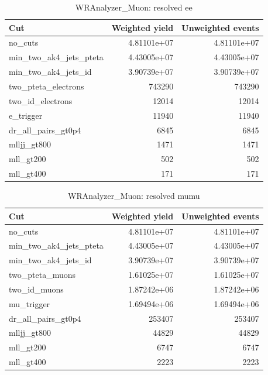 \documentclass{article}
\begin{document}
\begin{table}[htbp]
\centering
\caption{WRAnalyzer\_Muon: resolved ee}
\begin{tabular}{lrr}
\hline
Cut & Weighted yield & Unweighted events \\
\hline
no\_cuts & 4.81101e+07 & 4.81101e+07 \\
min\_two\_ak4\_jets\_pteta & 4.43005e+07 & 4.43005e+07 \\
min\_two\_ak4\_jets\_id & 3.90739e+07 & 3.90739e+07 \\
two\_pteta\_electrons & 743290 & 743290 \\
two\_id\_electrons & 12014 & 12014 \\
e\_trigger & 11940 & 11940 \\
dr\_all\_pairs\_gt0p4 & 6845 & 6845 \\
mlljj\_gt800 & 1471 & 1471 \\
mll\_gt200 & 502 & 502 \\
mll\_gt400 & 171 & 171 \\
\hline
\end{tabular}
\end{table}

\begin{table}[htbp]
\centering
\caption{WRAnalyzer\_Muon: resolved mumu}
\begin{tabular}{lrr}
\hline
Cut & Weighted yield & Unweighted events \\
\hline
no\_cuts & 4.81101e+07 & 4.81101e+07 \\
min\_two\_ak4\_jets\_pteta & 4.43005e+07 & 4.43005e+07 \\
min\_two\_ak4\_jets\_id & 3.90739e+07 & 3.90739e+07 \\
two\_pteta\_muons & 1.61025e+07 & 1.61025e+07 \\
two\_id\_muons & 1.87242e+06 & 1.87242e+06 \\
mu\_trigger & 1.69494e+06 & 1.69494e+06 \\
dr\_all\_pairs\_gt0p4 & 253407 & 253407 \\
mlljj\_gt800 & 44829 & 44829 \\
mll\_gt200 & 6747 & 6747 \\
mll\_gt400 & 2223 & 2223 \\
\hline
\end{tabular}
\end{table}
\end{document}

